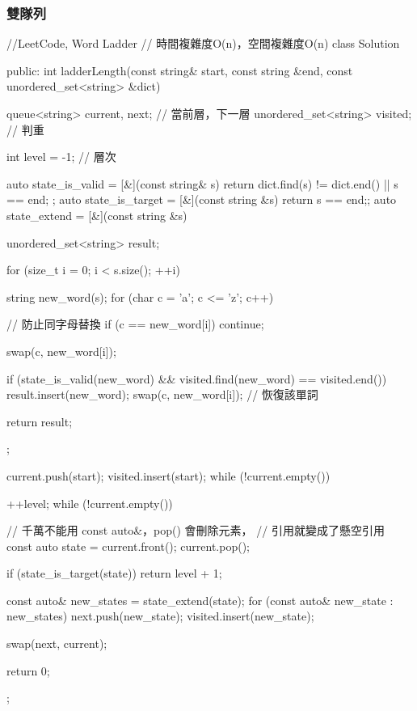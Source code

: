 \subsubsection{雙隊列}
\begin{Code}
//LeetCode, Word Ladder
// 時間複雜度O(n)，空間複雜度O(n)
class Solution {
public:
    int ladderLength(const string& start, const string &end,
            const unordered_set<string> &dict) {
        queue<string> current, next;    // 當前層，下一層
        unordered_set<string> visited;  // 判重

        int level = -1;  // 層次

        auto state_is_valid = [&](const string& s) {
            return dict.find(s) != dict.end() || s == end;
        };
        auto state_is_target = [&](const string &s) {return s == end;};
        auto state_extend = [&](const string &s) {
            unordered_set<string> result;

            for (size_t i = 0; i < s.size(); ++i) {
                string new_word(s);
                for (char c = 'a'; c <= 'z'; c++) {
                    // 防止同字母替換
                    if (c == new_word[i]) continue;

                    swap(c, new_word[i]);

                    if (state_is_valid(new_word) &&
                        visited.find(new_word) == visited.end()) {
                        result.insert(new_word);
                    }
                    swap(c, new_word[i]); // 恢復該單詞
                }
            }

            return result;
        };

        current.push(start);
        visited.insert(start);
        while (!current.empty()) {
            ++level;
            while (!current.empty()) {
                // 千萬不能用 const auto&，pop() 會刪除元素，
                // 引用就變成了懸空引用
                const auto state = current.front();
                current.pop();

                if (state_is_target(state)) {
                    return level + 1;
                }

                const auto& new_states = state_extend(state);
                for (const auto& new_state : new_states) {
                    next.push(new_state);
                    visited.insert(new_state);
                }
            }
            swap(next, current);
        }
        return 0;
    }
};
\end{Code}


